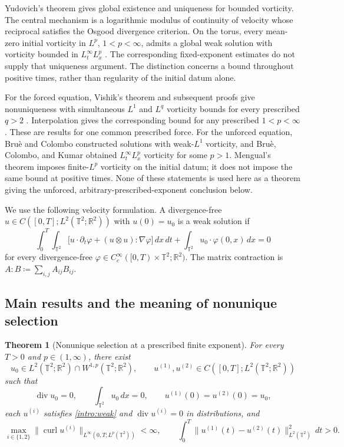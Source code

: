 \documentclass[11pt]{amsart}
\newtheorem{theorem}{Theorem}[section]
\theoremstyle{remark}
\numberwithin{equation}{section}
\newcommand{\R}{\mathbb R}
\newcommand{\T}{\mathbb T}
\begin{document}
Yudovich's theorem \cite{Yudovich1963} gives global existence and
uniqueness for bounded vorticity. The central mechanism is a
logarithmic modulus of continuity of velocity whose reciprocal satisfies
the Osgood divergence criterion. On the torus, every mean-zero initial
vorticity in $L^p$, $1<p<\infty$, admits a global weak solution with
vorticity bounded in $L^\infty_tL^p_x$ \cite{DiPernaMajda1987}.
The corresponding fixed-exponent estimates do not supply that
uniqueness argument.
The distinction concerns a bound throughout positive times, rather
than regularity of the initial datum alone.

For the forced equation, Vishik's theorem and subsequent proofs give
nonuniqueness with simultaneous $L^1$ and $L^q$ vorticity bounds for
every prescribed $q>2$ \cite{VishikI,VishikII,VishikBook,CFMS}.
Interpolation gives the corresponding bound for any prescribed
$1<p<\infty$. These are results for one common prescribed force.
For the unforced equation, Bru\`e and Colombo \cite{BrueColombo2023}
constructed solutions with weak-$L^1$ vorticity, and Bru\`e, Colombo,
and Kumar \cite{BCK2024} obtained $L^\infty_tL^p_x$ vorticity for
some $p>1$. Mengual's theorem \cite{Mengual2024} imposes finite-$L^p$
vorticity on the initial datum; it does not impose the same bound at
positive times. None of these statements is used here as a theorem
giving the unforced, arbitrary-prescribed-exponent conclusion below.

We use the following velocity formulation. A divergence-free
$u\in C([0,T];L^2(\T^2;\R^2))$ with $u(0)=u_0$ is a weak solution if
\begin{equation}\label{intro:weak}
 \int_0^T\!\!\int_{\T^2}
 \bigl[u\cdot\partial_t\varphi+
       (u\otimes u):\nabla\varphi\bigr]\,dx\,dt
 +\int_{\T^2}u_0\cdot\varphi(0,x)\,dx=0
\end{equation}
for every divergence-free
$\varphi\in C_c^\infty([0,T)\times\T^2;\R^2)$.
The matrix contraction is $A:B\coloneqq\sum_{i,j}A_{ij}B_{ij}$.

\subsection{Main results and the meaning of nonunique selection}
\begin{theorem}[Nonunique selection at a prescribed finite exponent]
\label{main}
For every $T>0$ and $p\in(1,\infty)$, there exist
\[
 u_0\in L^2(\T^2;\R^2)\cap W^{1,p}(\T^2;\R^2),\qquad
 u^{(1)},u^{(2)}\in C([0,T];L^2(\T^2;\R^2))
\]
such that
\[
 \operatorname{div}u_0=0,\qquad \int_{\T^2}u_0\,dx=0,\qquad
 u^{(1)}(0)=u^{(2)}(0)=u_0,
\]
each $u^{(i)}$ satisfies \eqref{intro:weak} and
$\operatorname{div}u^{(i)}=0$ in distributions, and
\[
 \max_{i\in\{1,2\}}
 \|\operatorname{curl}u^{(i)}\|_{L^\infty(0,T;L^p(\T^2))}<\infty,
 \qquad
 \int_0^T\|u^{(1)}(t)-u^{(2)}(t)\|_{L^2(\T^2)}^2\,dt>0.
\]
\end{theorem}
\end{document}
